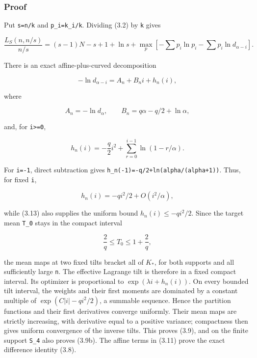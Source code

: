 \documentclass[
  11pt,
  a4paper,
]{article}
\begin{document}
\subsubsection{Proof}\label{proof-1}

Put \texttt{s=n/k} and \texttt{p\_i=k\_i/k}. Dividing (3.2) by
\texttt{k} gives

\[
 \frac{L_S(n,n/s)}{n/s}
 =(s-1)N-s+1+\ln s
 +\max_p\left[-\sum p_i\ln p_i-\sum p_i\ln d_{\alpha-i}\right].
                                                               \tag{3.10}
\]

There is an exact affine-plus-curved decomposition

\[
 -\ln d_{\alpha-i}=A_n+B_ni+h_n(i),                      \tag{3.11}
\]

where

\[
 A_n=-\ln d_\alpha,\qquad
 B_n=q\alpha-q/2+\ln\alpha,                              \tag{3.12}
\]

and, for \texttt{i\textgreater{}=0},

\[
 h_n(i)=-\frac q2i^2+\sum_{r=0}^{i-1}\ln(1-r/\alpha).   \tag{3.13}
\]

For \texttt{i=-1}, direct subtraction gives
\texttt{h\_}\allowbreak{}\texttt{n(-1)}\allowbreak{}\texttt{=}\allowbreak{}\texttt{-q/}\allowbreak{}\texttt{2+}\allowbreak{}\texttt{ln(alpha/}\allowbreak{}\texttt{(alpha+}\allowbreak{}\texttt{1)}\allowbreak{}\texttt{)}.
Thus, for fixed \texttt{i},

\[
 h_n(i)=-qi^2/2+O(i^2/\alpha),                           \tag{3.14}
\]

while (3.13) also supplies the uniform bound \(h_n(i)\le-qi^2/2\). Since
the target mean \texttt{T\_0} stays in the compact interval

\[
 \frac2q\le T_0\le1+\frac2q,                             \tag{3.15}
\]

the mean maps at two fixed tilts bracket all of \(K_*\), for both
supports and all sufficiently large \texttt{n}. The effective Lagrange
tilt is therefore in a fixed compact interval. Its optimizer is
proportional to \(\exp(\lambda i+h_n(i))\). On every bounded tilt
interval, the weights and their first moments are dominated by a
constant multiple of \(\exp(C|i|-qi^2/2)\), a summable sequence. Hence
the partition functions and their first derivatives converge uniformly.
Their mean maps are strictly increasing, with derivative equal to a
positive variance; compactness then gives uniform convergence of the
inverse tilts. This proves (3.9), and on the finite support
\texttt{S\_4} also proves (3.9b). The affine terms in (3.11) prove the
exact difference identity (3.8).
\end{document}
